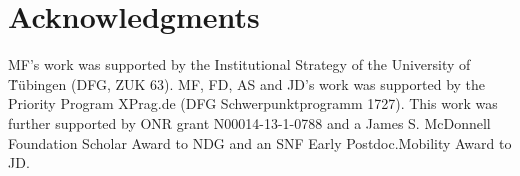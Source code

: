 \documentclass[10pt,letterpaper]{article}
\begin{document}
\section{Acknowledgments}

MF's work was supported by the Institutional Strategy of the University of T̈\"{u}bingen
(DFG, ZUK 63). MF, FD, AS and JD's work was supported by the
Priority Program XPrag.de (DFG Schwerpunktprogramm 1727). This work was further supported by
ONR grant N00014-13-1-0788 and a James S. McDonnell Foundation Scholar Award to NDG and an SNF
Early Postdoc.Mobility Award to JD.





\setlength{\bibleftmargin}{.125in}
\setlength{\bibindent}{-\bibleftmargin}


\end{document}
